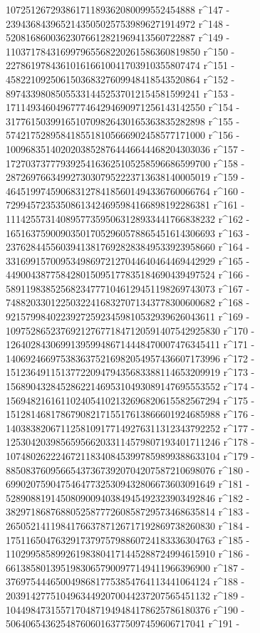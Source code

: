        10725126729386171189362080099552454888 r^147 - 
       23943684396521435050257539896271914972 r^148 - 
       52081686003623076612821969413560722887 r^149 - 
       110371784316997965568220261586360819850 r^150 - 
       227861978436101616610041703910355807474 r^151 - 
       458221092506150368327609948418543520864 r^152 - 
       897433980850553314452537012154581599241 r^153 - 
       1711493460496777464294690971256143142550 r^154 - 
       3177615039916510709826430165363835282898 r^155 - 
       5742175289584185518105666902458577171000 r^156 - 
       10096835140202038528764446644468204303036 r^157 - 
       17270373777939254163625105258596686599700 r^158 - 
       28726976634992730307952223713638140005019 r^159 - 
       46451997459068312784185601494336760066764 r^160 - 
       72994572353508613424695984166898192286381 r^161 - 
       111425573140895773595063128933441766838232 r^162 - 
       165163759009035017052960578865451614306693 r^163 - 
       237628445560394138176928283849533923958660 r^164 - 
       331699157009534986972127044640464469442929 r^165 - 
       449004387758428015095177835184690439497524 r^166 - 
       589119838525682347771046129451198269743073 r^167 - 
       748820330122503224168327071343778300600682 r^168 - 
       921579984022392725923459810532939626043611 r^169 - 
       1097528652376921276771847120591407542925830 r^170 - 
       1264028430699139599486714448470007476345411 r^171 - 
       1406924669753836375216982054957436607173996 r^172 - 
       1512364911513772209479435683388114653209919 r^173 - 
       1568904328452862214695310493089147695553552 r^174 - 
       1569482161611024054102132696820615582567294 r^175 - 
       1512814681786790821715517613866601924685988 r^176 - 
       1403838206711258109177149276311312343792252 r^177 - 
       1253042039856595662033114579807193401711246 r^178 - 
       1074802622246721183408453997859899388633104 r^179 - 
       885083760956654373673920704207587210698076 r^180 - 
       699020759047546477325309432806673603091649 r^181 - 
       528908819145080900940384945492323903492846 r^182 - 
       382971868768805258777260858729573468635814 r^183 - 
       265052141198417663787126717192869738260830 r^184 - 
       175116504763291737975798860724183336304763 r^185 - 
       110299585899261983804171445288724994615910 r^186 - 
       66138580139519830657900977149411966396900 r^187 - 
       37697544465004986817753854764113441064124 r^188 - 
       20391427751049634492070044237207565451132 r^189 - 
       10449847315571704871949484178625786180376 r^190 - 
       5064065436254876060163775097459606717041 r^191 - 
